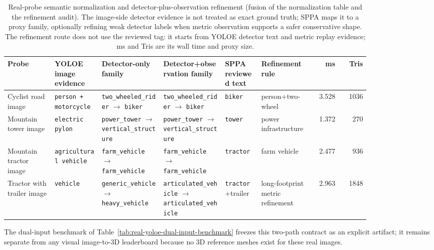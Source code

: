 \documentclass[10pt]{article}
\begin{document}
\begin{table}[H]
\centering
\scriptsize
\setlength{\tabcolsep}{3pt}
\renewcommand{\arraystretch}{1.06}
\caption{Real-probe semantic normalization and detector-plus-observation
refinement (fusion of the normalization table and the refinement audit). The
image-side detector evidence is not treated as exact ground truth; SPPA maps
it to a proxy family, optionally refining weak detector labels when metric
observation supports a safer conservative shape. The refinement route does
not use the reviewed tag: it starts from YOLOE detector text and metric
replay evidence; ms and Tris are its wall time and proxy size.}
\label{tab:real-probe-normalization}
\begin{tabularx}{\linewidth}{@{}L{0.13\linewidth}L{0.13\linewidth}L{0.17\linewidth}L{0.17\linewidth}L{0.10\linewidth}L{0.14\linewidth}r r@{}}
\toprule
Probe & YOLOE image evidence & Detector-only family & Detector+observation family & SPPA reviewed text & Refinement rule & ms & Tris \\
\midrule
Cyclist road image & \texttt{person + motorcycle} & \texttt{two\_wheeled\_rider} $\rightarrow$ \texttt{biker} & \texttt{two\_wheeled\_rider} $\rightarrow$ \texttt{biker} & \texttt{biker} & person+two-wheel & 3.528 & 1036 \\
Mountain tower image & \texttt{electric pylon} & \texttt{power\_tower} $\rightarrow$ \texttt{vertical\_structure} & \texttt{power\_tower} $\rightarrow$ \texttt{vertical\_structure} & \texttt{tower} & power infrastructure & 1.372 & 270 \\
Mountain tractor image & \texttt{agricultural vehicle} & \texttt{farm\_vehicle} $\rightarrow$ \texttt{farm\_vehicle} & \texttt{farm\_vehicle} $\rightarrow$ \texttt{farm\_vehicle} & \texttt{tractor} & farm vehicle & 2.477 & 936 \\
Tractor with trailer image & \texttt{vehicle} & \texttt{generic\_vehicle} $\rightarrow$ \texttt{heavy\_vehicle} & \texttt{articulated\_vehicle} $\rightarrow$ \texttt{articulated\_vehicle} & \texttt{tractor}+trailer & long-footprint metric refinement & 2.963 & 1848 \\
\bottomrule
\end{tabularx}
\end{table}

The dual-input benchmark of Table~\ref{tab:real-yoloe-dual-input-benchmark}
freezes this two-path contract as an explicit artifact; it remains separate
from any visual image-to-3D leaderboard because no 3D reference meshes exist
for these real images.
\end{document}
